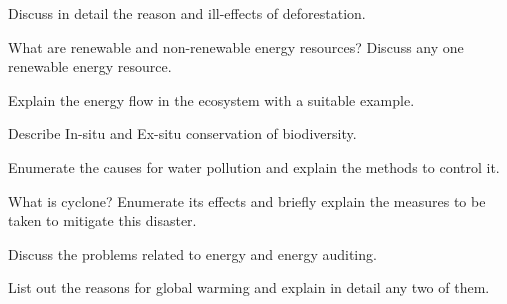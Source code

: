 \markB
\partC

\item Discuss in detail the reason and ill-effects of deforestation.
\Or
\item What are renewable and non-renewable energy resources? Discuss any one renewable energy
  resource.

\newpage \again

\item Explain the energy flow in the ecosystem with a suitable example.
\Or
\item Describe In-situ and Ex-situ conservation of biodiversity.

\item Enumerate the causes for water pollution and explain the methods to control it.
\Or
\item What is cyclone? Enumerate its effects and briefly explain the measures to be taken to 
  mitigate this disaster.

\item Discuss the problems related to energy and energy auditing.
\Or
\item List out the reasons for global warming and explain in detail any two of them.

\markC
\ene


